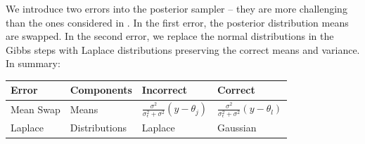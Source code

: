 \documentclass{article}
\begin{document}
We introduce two errors into the posterior sampler -- they are more challenging than the ones considered in \cite{gandy_unit_2020}. 
In the first error, the posterior distribution means are swapped. In the second error, we replace the normal distributions in the Gibbs steps with Laplace distributions preserving the correct means and variance. In summary:
\begin{center}
    \begin{tabular}{llll}
          Error & Components & Incorrect & Correct \\
    \midrule  
         Mean Swap & Means &  $\frac{\sigma^{2}}{\sigma_{\epsilon}^{2}+\sigma^{2}}\left(y-\theta_{j}\right)$ & $\frac{\sigma^{2}}{\sigma_{\epsilon}^{2}+\sigma^{2}}\left(y-\theta_{l}\right)$\\
         Laplace & Distributions & Laplace & Gaussian \\
    \end{tabular}
\end{center}

\end{document}
